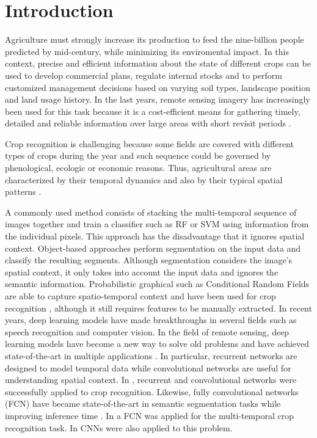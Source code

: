 
\section{Introduction}

Agriculture must strongly increase its production to feed the nine-billion people predicted by mid-century, while minimizing its enviromental impact. In this context, precise and efficient information about the state of different crops can be used to develop commercial plans, regulate internal stocks and to perform customized management decisions based on varying soil types, landscape position and land usage history. In the last years, remote sensing imagery has increasingly been used for this task because it is a cost-efficient means for gathering timely, detailed and reliable information over large areas with short revisit periods \cite{thenkabail2015land,leite2011hidden}.

Crop recognition is challenging because some fields are covered with different types of crops during the year and such sequence could be governed by phenological, ecologic or economic reasons. Thus, agricultural areas are characterized by their temporal dynamics and also by their typical spatial patterns \cite{lohmann2008multi,waske2009classifier}. 

A commonly used method consists of stacking the multi-temporal sequence of images together and train a classifier such as RF or SVM using information from the individual pixels. This approach has the disadvantage that it ignores spatial context. Object-based approaches perform segmentation on the input data and classify the resulting segments. Although segmentation considers the image's spatial context, it only takes into account the input data and ignores the semantic information. Probabilistic graphical such as Conditional Random Fields are able to capture spatio-temporal context and have been used for crop recognition \cite{achanccaray2017spatial}, although it still requires features to be manually extracted. In recent years, deep learning models have made breakthroughs in several fields such as speech recognition and computer vision. In the field of remote sensing, deep learning models have become a new way to solve old problems and have achieved state-of-the-art in multiple applications \cite{audebertdeep}. In particular, recurrent networks are designed to model temporal data while convolutional networks are useful for understanding spatial context. In \cite{jose}, recurrent and convolutional networks were successfully applied to crop recognition. Likewise, fully convolutional networks (FCN) have became state-of-the-art in semantic segmentation tasks while improving inference time \cite{long2015fully}. In \cite{} a FCN was applied for the multi-temporal crop recognition task. In \cite{castro2017comparative} CNNs were also applied to this problem. 

